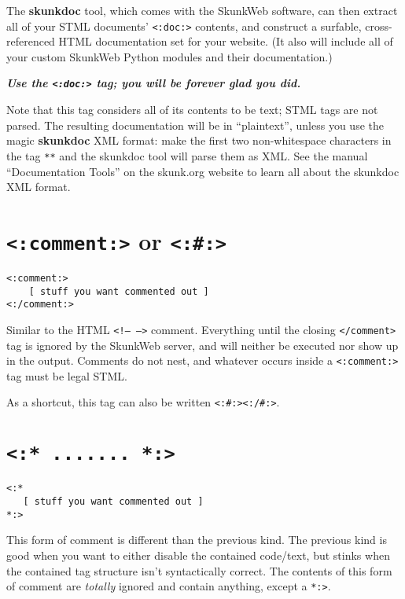 \documentclass{manual}
\begin{document}
{{The \textbf{skunkdoc} tool, which comes with the SkunkWeb software, can
then extract all of your STML documents' \texttt{<:doc:>} 
contents, and construct a surfable, cross-referenced HTML
documentation set for your website. (It also will include all of
your custom SkunkWeb Python modules and their documentation.)

\textbf{\emph{Use the \texttt{<:doc:>}
tag; you will be forever glad you did.}}

Note that this tag considers all of its contents to be text; STML tags
are not parsed. The resulting documentation will be in ``plaintext'', unless
you use the magic \textbf{skunkdoc} XML format: make the first two
non-whitespace characters in the tag \texttt{**} and the skunkdoc tool
will parse them as XML. See the manual ``Documentation Tools'' on the skunk.org
website to learn all about the skunkdoc XML format.


\section{\texttt{<:comment:>} or \texttt{<:\#:>}}
\label{tagcomment}

\begin{verbatim}
<:comment:>
    [ stuff you want commented out ]
<:/comment:>
\end{verbatim}

Similar to the HTML \texttt{<!-- -->} comment. Everything until
the closing \texttt{</comment>} tag is ignored by the SkunkWeb server,
and will neither be executed nor show up in the output. 
Comments do not nest,
and whatever occurs inside a \texttt{<:comment:>} tag must
be legal STML. 

As a shortcut, this tag can also be written
\texttt{<:\#:><:/\#:>}.

   


\section{\texttt{<:* ....... *:>}}
\label{fullcomment}
\begin{verbatim}
<:*
   [ stuff you want commented out ]
*:>
\end{verbatim}

This form of comment is different than the previous kind.  The
previous kind is good when you want to either disable the contained
code/text, but stinks when the contained tag structure isn't
syntactically correct.  The contents of this form of comment are
\emph{totally} ignored and contain anything, except a \texttt{*:>}.


}}
\end{document}
